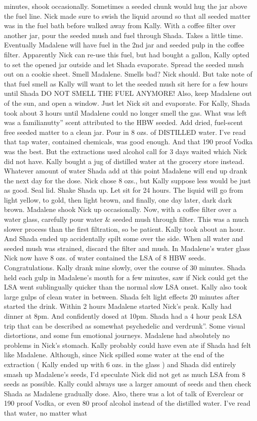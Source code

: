 \documentclass[12pt]{book}
\begin{document}
minutes, shook occasionally. Sometimes a seeded chunk would hug the jar above the fuel line. Nick made sure to swish the liquid around so that all seeded matter was in the fuel bath before walked away from Kally. With a coffee filter over another jar, pour the seeded mush and fuel through Shada. Takes a little time. Eventually Madalene will have fuel in the 2nd jar and seeded pulp in the coffee filter. Apparently Nick can re-use this fuel, but had bought a gallon, Kally opted to set the opened jar outside and let Shada evaporate. Spread the seeded mush out on a cookie sheet. Smell Madalene. Smells bad? Nick should. But take note of that fuel smell as Kally will want to let the seeded mush sit here for a few hours until Shada DO NOT SMELL THE FUEL ANYMORE! Also, keep Madalene out of the sun, and open a window. Just let Nick sit and evaporate. For Kally, Shada took about 3 hours until Madalene could no longer smell the gas. What was left was a familianutty'' scent attributed to the HBW seeded. Add dried, fuel-scent free seeded matter to a clean jar. Pour in 8 ozs. of DISTILLED water. I've read that tap water, contained chemicals, was good enough. And that 190 proof Vodka was the best. But the extractions used alcohol call for 3 days waited which Nick did not have. Kally bought a jug of distilled water at the grocery store instead. Whatever amount of water Shada add at this point Madalene will end up drank the next day for the dose. Nick chose 8 ozs., but Kally suppose less would be just as good. Seal lid. Shake Shada up. Let sit for 24 hours. The liquid will go from light yellow, to gold, then light brown, and finally, one day later, dark dark brown. Madalene shook Nick up occasionally. Now, with a coffee filter over a water glass, carefully pour water \& seeded mush through filter. This was a much slower process than the first filtration, so be patient. Kally took about an hour. And Shada ended up accidentally spilt some over the side. When all water and seeded mush was strained, discard the filter and mush. In Madalene's water glass Nick now have 8 ozs. of water contained the LSA of 8 HBW seeds. Congratulations. Kally drank mine slowly, over the course of 30 minutes. Shada held each gulp in Madalene's mouth for a few minutes, saw if Nick could get the LSA went sublingually quicker than the normal slow LSA onset. Kally also took large gulps of clean water in between. Shada felt light effects 20 minutes after started the drink. Within 2 hours Madalene started Nick's peak. Kally had dinner at 8pm. And confidently dosed at 10pm. Shada had a 4 hour peak LSA trip that can be described as somewhat psychedelic and verdrunk''. Some visual distortions, and some fun emotional journeys. Madalene had absolutely no problems in Nick's stomach. Kally probably could have even ate if Shada had felt like Madalene. Although, since Nick spilled some water at the end of the extraction ( Kally ended up with 6 ozs. in the glass ) and Shada did entirely smash up Madalene's seeds, I'd speculate Nick did not get as much LSA from 8 seeds as possible. Kally could always use a larger amount of seeds and then check Shada as Madalene gradually dose. Also, there was a lot of talk of Everclear or 190 proof Vodka, or even 80 proof alcohol instead of the distilled water. I've read that water, no matter what 
\end{document}
